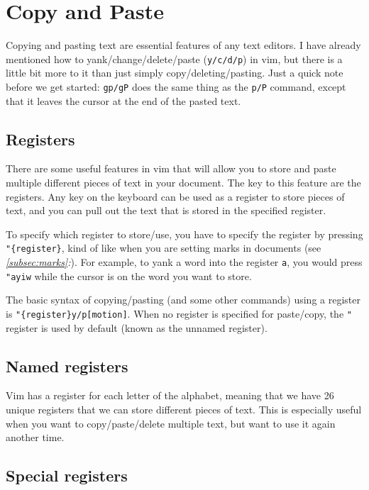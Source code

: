 \chapter{Copy and Paste}

Copying and pasting text are essential features of any text editors.
I have already mentioned how to yank/change/delete/paste (\verb|y/c/d/p|) in vim, but there is a little bit more to it than just simply copy/deleting/pasting.
Just a quick note before we get started: \verb|gp/gP| does the same thing as the \verb|p/P| command, except that it leaves the cursor at the end of the pasted text.

\section{Registers}

There are some useful features in vim that will allow you to store and paste multiple different pieces of text in your document.
The key to this feature are the registers.
Any key on the keyboard can be used as a register to store pieces of text, and you can pull out the text that is stored in the specified register.

To specify which register to store/use, you have to specify the register by pressing \verb|"{register}|, kind of like when you are setting marks in documents (see \textit{\ref{subsec:marks}:}).
For example, to yank a word into the register \verb|a|, you would press \verb|"ayiw| while the cursor is on the word you want to store.

The basic syntax of copying/pasting (and some other commands) using a register is \verb|"{register}y/p[motion]|.
When no register is specified for paste/copy, the \verb|"| register is used by default (known as the unnamed register).

\section{Named registers}

Vim has a register for each letter of the alphabet, meaning that we have 26 unique registers that we can store different pieces of text.
This is especially useful when you want to copy/paste/delete multiple text, but want to use it again another time.

\section{Special registers}

